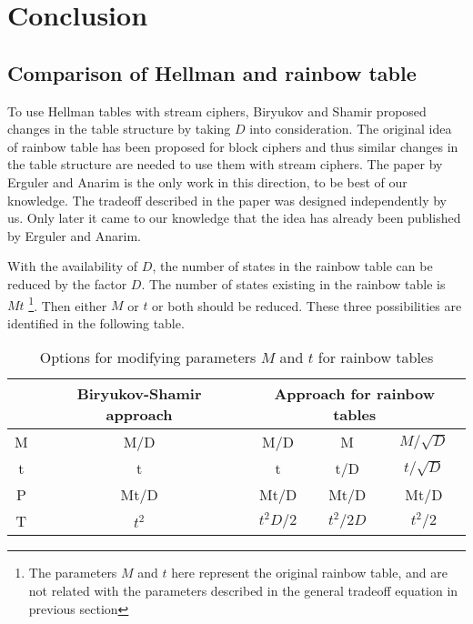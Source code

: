 \chapter{Conclusion}

\section{Comparison of Hellman and rainbow table}
\label{sec:compare-hellman-rainbow}

To use Hellman tables with stream ciphers, Biryukov and Shamir proposed changes in the table structure by taking $D$ into consideration. The original idea of rainbow table has been proposed for block ciphers and thus similar changes in the table structure are needed to use them with stream ciphers. The paper \cite{erguler2005nct} by Erguler and Anarim is the only work in this direction, to be best of our knowledge. The tradeoff described in the paper was designed independently by us. Only later it came to our knowledge that the idea has already been published by Erguler and Anarim.

With the availability of $D$, the number of states in the rainbow table can be reduced by the factor $D$. The number of states existing in the rainbow table is $Mt$ \footnote{The parameters $M$ and $t$ here represent the original rainbow table, and are not related with the parameters described in the general tradeoff equation in previous section}. Then either $M$ or $t$ or both should be reduced. These three possibilities are identified in the following table. 

\begin{table}[ht!]
\begin{center}
\begin{tabular}{|c||c||c c c|}
\hline
			& Biryukov-Shamir approach 	& \multicolumn{3}{c|}{Approach for rainbow tables}					\\ \hline \hline
M			&	M/D		&	M/D				&	M						& $M/\sqrt{D}$	\\
t			&	t			&	t					&	t/D					& $t/\sqrt{D}$	\\ \hline \hline
P			&	Mt/D	&	Mt/D			&	Mt/D				& Mt/D					\\ 
T			&	$t^2$	&	$t^2D/2$	&	$t^2/2D$		& $t^2/2$				\\ \hline
\end{tabular}
\end{center} 
\caption{Options for modifying parameters $M$ and $t$ for rainbow tables}
\label{tab:parameters-rainbow-table}
\end{table}

